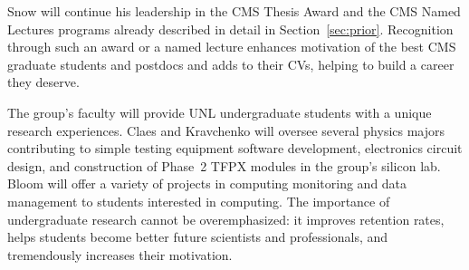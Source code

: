 
\noindent
Snow will continue his leadership in the CMS Thesis Award and the CMS Named Lectures programs already described in detail in Section~\ref{sec:prior}. Recognition through such an award or a named lecture enhances motivation of the best CMS graduate students and postdocs and adds to their CVs, helping to build a career they deserve.

The group's faculty will provide UNL undergraduate students with a unique research experiences. Claes and Kravchenko will oversee several physics majors contributing to simple testing equipment software development, electronics circuit design, and construction of Phase~2 TFPX modules in the group's silicon lab.
Bloom will offer a variety of projects in computing monitoring and data management to students interested in computing.
The importance of undergraduate research cannot be overemphasized: it improves retention rates, helps students become better future 
scientists and professionals, and tremendously increases their motivation.

